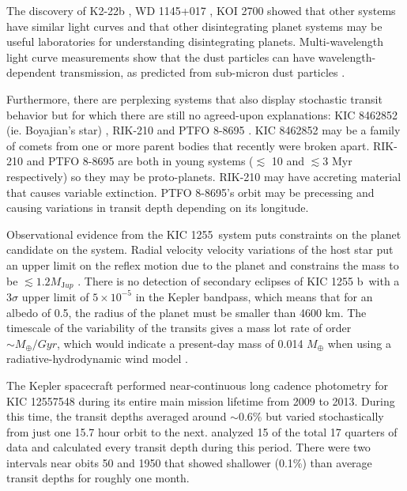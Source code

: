 \documentclass[twocolumn]{aastex61}
\newcommand{\sha}{KIC 1255 b}
\newcommand{\shStar}{KIC 1255}
\begin{document}
The discovery of K2-22b \citep{sanchis-ojedak2-22}, WD 1145+017 \citep{vanderburg2015wdDisintegrating}, KOI 2700 \citep{rappaport2014KOI2700} showed that other systems have similar light curves and that other disintegrating planet systems may be useful laboratories for understanding disintegrating planets.
Multi-wavelength light curve measurements show that the dust particles can have wavelength-dependent transmission, as predicted from sub-micron dust particles \citep{bochinski2015evolving,sanchis-ojedak2-22}.

Furthermore, there are perplexing systems that also display stochastic transit behavior but for which there are still no agreed-upon explanations: KIC 8462852 (ie. Boyajian's star) \citep{boyajian846}, RIK-210 \citep{david2017rik210} and PTFO 8-8695 \citep{vanEyken2012ptfTTauri}.
KIC 8462852 may be a family of comets from one or more parent bodies that recently were broken apart.
RIK-210 and PTFO 8-8695 are both in young systems ($\lesssim$ 10 and $\lesssim$3 Myr respectively) so they may be proto-planets.
RIK-210 may have accreting material that causes variable extinction.
PTFO 8-8695's orbit may be precessing and causing variations in transit depth depending on its longitude.

Observational evidence from the \shStar\ system puts constraints on the planet candidate on the system.
Radial velocity velocity variations of the host star put an upper limit on the reflex motion due to the planet and constrains the mass to be $\lesssim 1.2 M_{\mathrm Jup}$ \citep{croll2014}.
There is no detection of secondary eclipses of \sha\ with a 3$\sigma$ upper limit of $5 \times 10^{-5}$ in the Kepler bandpass, which means that for an albedo of 0.5, the radius of the planet must be smaller than 4600 km.
The timescale of the variability of the transits gives a mass lot rate of order $\sim M_\oplus/Gyr$, which would indicate a present-day mass of 0.014 $M_\oplus$ when using a radiative-hydrodynamic wind model \citep{perez-becker}.

The Kepler spacecraft performed near-continuous long cadence photometry for KIC 12557548 during its entire main mission lifetime from 2009 to 2013.
During this time, the transit depths averaged around $\sim$0.6\% but varied stochastically from just one 15.7 hour orbit to the next.
\citet{vanWerkhoven2014} analyzed 15 of the total 17 quarters of data and calculated every transit depth during this period.
There were two intervals near obits 50 and 1950 that showed shallower (0.1\%) than average transit depths for roughly one month.
\end{document}
